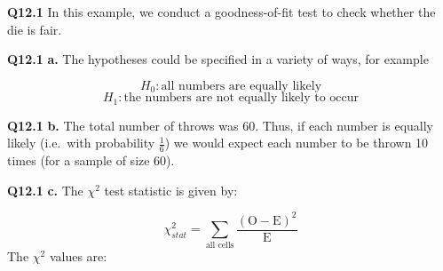 \documentclass[
  oneside]{krantz}
\begin{document}
\textbf{Q12.1} In this example, we conduct a goodness-of-fit test to check whether the die is fair.

\textbf{Q12.1} \textbf{a.} The hypotheses could be specified in a variety of ways, for example

\[H_0: \textrm{all numbers are equally likely} \]
\[H_1: \textrm{the numbers are not equally likely to occur}\]

\textbf{Q12.1} \textbf{b.} The total number of throws was 60. Thus, if each number is equally likely (i.e.~with probability \(\frac{1}{6}\)) we would expect each number to be thrown 10 times (for a sample of size 60).

\textbf{Q12.1} \textbf{c.} The \(\chi^2\) test statistic is given by:

\[\chi_{stat}^2 = \sum_{\textrm{all cells}} \frac{(\textrm{O} - \textrm{E})^2}{\textrm{E}}\]
The \(\chi^2\) values are:
\end{document}
